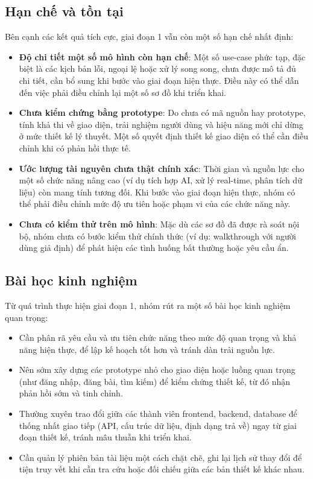 \subsection{Hạn chế và tồn tại}

Bên cạnh các kết quả tích cực, giai đoạn 1 vẫn còn một số hạn chế nhất định:

\begin{itemize}
    \item \textbf{Độ chi tiết một số mô hình còn hạn chế}: Một số use-case phức tạp, đặc biệt là các kịch bản lỗi, ngoại lệ hoặc xử lý song song, chưa được mô tả đủ chi tiết, cần bổ sung khi bước vào giai đoạn hiện thực. Điều này có thể dẫn đến việc phải điều chỉnh lại một số sơ đồ khi triển khai.
    \item \textbf{Chưa kiểm chứng bằng prototype}: Do chưa có mã nguồn hay prototype, tính khả thi về giao diện, trải nghiệm người dùng và hiệu năng mới chỉ dừng ở mức thiết kế lý thuyết. Một số quyết định thiết kế giao diện có thể cần điều chỉnh khi có phản hồi thực tế.
    \item \textbf{Ước lượng tài nguyên chưa thật chính xác}: Thời gian và nguồn lực cho một số chức năng nâng cao (ví dụ tích hợp AI, xử lý real-time, phân tích dữ liệu) còn mang tính tương đối. Khi bước vào giai đoạn hiện thực, nhóm có thể phải điều chỉnh mức độ ưu tiên hoặc phạm vi của các chức năng này.
    \item \textbf{Chưa có kiểm thử trên mô hình}: Mặc dù các sơ đồ đã được rà soát nội bộ, nhóm chưa có bước kiểm thử chính thức (ví dụ: walkthrough với người dùng giả định) để phát hiện các tình huống bất thường hoặc yêu cầu ẩn.
\end{itemize}

\subsection{Bài học kinh nghiệm}

Từ quá trình thực hiện giai đoạn 1, nhóm rút ra một số bài học kinh nghiệm quan trọng:

\begin{itemize}
    \item Cần phân rã yêu cầu và ưu tiên chức năng theo mức độ quan trọng và khả năng hiện thực, để lập kế hoạch tốt hơn và tránh dàn trải nguồn lực.
    \item Nên sớm xây dựng các prototype nhỏ cho giao diện hoặc luồng quan trọng (như đăng nhập, đăng bài, tìm kiếm) để kiểm chứng thiết kế, từ đó nhận phản hồi sớm và tinh chỉnh.
    \item Thường xuyên trao đổi giữa các thành viên frontend, backend, database để thống nhất giao tiếp (API, cấu trúc dữ liệu, định dạng trả về) ngay từ giai đoạn thiết kế, tránh mâu thuẫn khi triển khai.
    \item Cần quản lý phiên bản tài liệu một cách chặt chẽ, ghi lại lịch sử thay đổi để tiện truy vết khi cần tra cứu hoặc đối chiếu giữa các bản thiết kế khác nhau.
\end{itemize}


